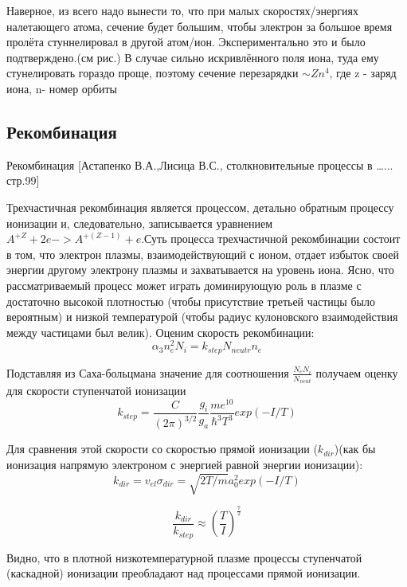 \documentclass[10pt, a4paper]{article}
\begin{document}
Наверное, из всего надо вынести то, что при малых скоростях/энергиях налетающего атома, сечение будет большим, чтобы электрон за большое время пролёта стуннелировал в другой атом/ион. Экспериментально это и было подтверждено.(см рис.) В случае сильно искривлённого поля иона, туда ему стунелировать гораздо проще, поэтому сечение перезарядки $\sim Zn^{4}$, где z - заряд иона, n- номер орбиты

\subsection{Рекомбинация}
\label{sec.2.6}
Рекомбинация [Астапенко В.А.,Лисица В.С., столкновительные процессы в …... стр.99]


Трехчастичная рекомбинация является процессом, детально обратным процессу ионизации и, следовательно, записывается уравнением $A^{+Z} + 2e -> A^{+(Z-1)} + e $.Суть процесса трехчастичной рекомбинации состоит в том, что электрон плазмы, взаимодействующий с ионом, отдает избыток своей энергии другому электрону плазмы и захватывается на  уровень иона. Ясно, что рассматриваемый процесс может играть доминирующую роль в плазме с достаточно высокой плотностью (чтобы присутствие третьей частицы было вероятным) и низкой температурой (чтобы радиус кулоновского взаимодействия между частицами был велик). Оценим скорость рекомбинации:
\begin{equation}
\alpha_3 n^2_e N_i = k_{step} N_{neutr} n_e
\end{equation}

Подставляя из Саха-больцмана значение для соотношения $\frac{N_e N_i}{N_{neut}}$ получаем оценку для скорости ступенчатой ионизации
\begin{equation}
	k_{step}=\frac{C}{(2\pi)^{3/2}}\frac{g_i}{g_a}\frac{me^{10}}{\hbar^{3}T^{3}}exp(-I/T)
\end{equation}

Для сравнения этой скорости со скоростью прямой ионизации ($k_{dir}$)(как бы ионизация напрямую электроном с энергией равной энергии ионизации):
 \begin{equation}
 	k_{dir}=v_{el} \sigma_{dir}=\sqrt{2T/m} a_{0}^{2} exp(-I/T)
 \end{equation}

 \begin{equation}
 		\frac{k_{dir}}{k_{step}} \approx (\frac{T}{I})^{\frac{7}{2}}
 \end{equation}


Видно, что в плотной низкотемпературной плазме процессы ступенчатой (каскадной) ионизации преобладают над процессами прямой ионизации. 
\end{document}
